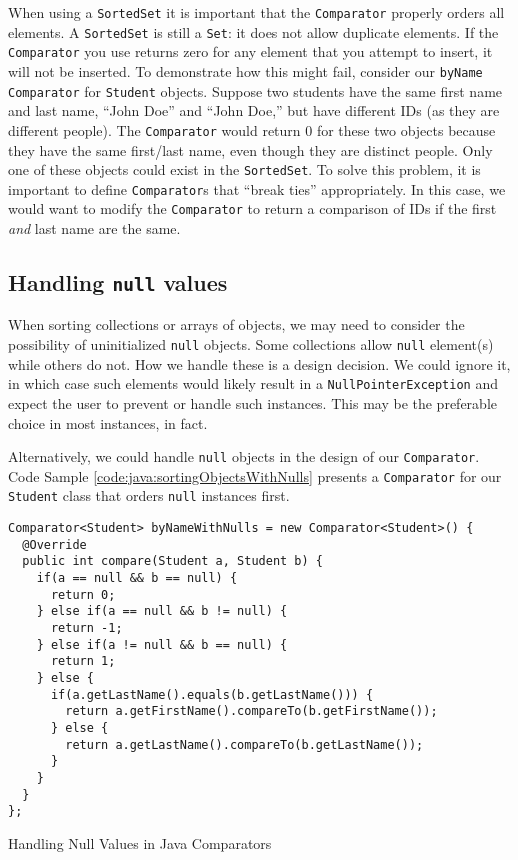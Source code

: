 When using a \texttt{SortedSet} it is important that the 
\texttt{Comparator} properly orders all elements.  A 
\texttt{SortedSet} is still a \texttt{Set}: it
does not allow duplicate elements.  If the \texttt{Comparator} 
you use returns zero for any element that you attempt to insert, it
will not be inserted.  To demonstrate how this might fail, consider
our \texttt{byName} \texttt{Comparator} for 
\texttt{Student} objects.  Suppose two students have
the same first name and last name, ``John Doe'' and ``John Doe,'' but
have different IDs (as they are different people).
The \texttt{Comparator} would return 0 for these
two objects because they have the same first/last name, even though
they are distinct people.  Only one of these objects could 
exist in the \texttt{SortedSet}.
To solve this problem, it is important to define \texttt{Comparator}s
that ``break ties'' appropriately.  In this case, we would want to 
modify the \texttt{Comparator} to return a comparison
of IDs if the first \emph{and} last name are the same.  

\subsection{Handling \texttt{null} values}
\label{subsection:sortingObjectsWithNulls}

When sorting collections or arrays of objects, we may need to consider 
the possibility of uninitialized \texttt{null} objects.  Some
collections allow \texttt{null} element(s) while others do not.
How we handle these is a design decision.  We could ignore it, in which 
case such elements would likely result in a \texttt{NullPointerException} 
and expect the user to prevent or handle such instances.  This may be 
the preferable choice in most instances, in fact.

Alternatively, we could handle \texttt{null} objects in the 
design of our \texttt{Comparator}.  Code Sample 
\ref{code:java:sortingObjectsWithNulls} presents a \texttt{Comparator} 
for our \texttt{Student} class that orders \texttt{null}
instances first.

\begin{listing}[!h]
\begin{verbatim}
Comparator<Student> byNameWithNulls = new Comparator<Student>() {
  @Override
  public int compare(Student a, Student b) {
    if(a == null && b == null) {
      return 0;
    } else if(a == null && b != null) {
      return -1;
    } else if(a != null && b == null) {
      return 1;
    } else {
      if(a.getLastName().equals(b.getLastName())) {
        return a.getFirstName().compareTo(b.getFirstName());
      } else {
        return a.getLastName().compareTo(b.getLastName());
      }
    }
  }
};
\end{verbatim}
\caption{Handling Null Values in Java Comparators}
\label{code:java:sortingObjectsWithNulls}
\end{listing}

